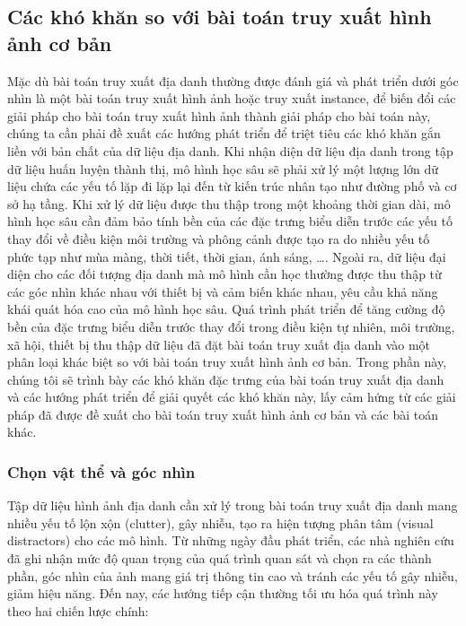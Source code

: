 \subsection{Các khó khăn so với bài toán truy xuất hình ảnh cơ bản}

Mặc dù bài toán truy xuất địa danh thường được đánh giá và phát triển dưới góc nhìn là một bài toán truy xuất hình ảnh hoặc truy xuất instance, để biến đổi các giải pháp cho bài toán truy xuất hình ảnh thành giải pháp cho bài toán này, chúng ta cần phải đề xuất các hướng phát triển để triệt tiêu các khó khăn gắn liền với bản chất của dữ liệu địa danh. Khi nhận diện dữ liệu địa danh trong tập dữ liệu huấn luyện thành thị, mô hình học sâu sẽ phải xử lý một lượng lớn dữ liệu chứa các yếu tố lặp đi lặp lại đến từ kiến trúc nhân tạo như đường phố và cơ sở hạ tầng. Khi xử lý dữ liệu được thu thập trong một khoảng thời gian dài, mô hình học sâu cần đảm bảo tính bền của các đặc trưng biểu diễn trước các yếu tố thay đổi về điều kiện môi trường và phông cảnh được tạo ra do nhiều yếu tố phức tạp như mùa màng, thời tiết, thời gian, ánh sáng, \dots. Ngoài ra, dữ liệu đại diện cho các đối tượng địa danh mà mô hình cần học thường được thu thập từ các góc nhìn khác nhau với thiết bị và cảm biến khác nhau, yêu cầu khả năng khái quát hóa cao của mô hình học sâu. Quá trình phát triển để tăng cường độ bền của đặc trưng biểu diễn trước thay đổi trong điều kiện tự nhiên, môi trường, xã hội, thiết bị thu thập dữ liệu đã đặt bài toán truy xuất địa danh vào một phân loại khác biệt so với bài toán truy xuất hình ảnh cơ bản. Trong phần này, chúng tôi sẽ trình bày các khó khăn đặc trưng của bài toán truy xuất địa danh và các hướng phát triển để giải quyết các khó khăn này, lấy cảm hứng từ các giải pháp đã được đề xuất cho bài toán truy xuất hình ảnh cơ bản và các bài toán khác.

\subsubsection{Chọn vật thể và góc nhìn}

Tập dữ liệu hình ảnh địa danh cần xử lý trong bài toán truy xuất địa danh mang nhiều yếu tố lộn xộn (clutter), gây nhiễu, tạo ra hiện tượng phân tâm (visual distractors) cho các mô hình. Từ những ngày đầu phát triển, các nhà nghiên cứu đã ghi nhận mức độ quan trọng của quá trình quan sát và chọn ra các thành phần, góc nhìn của ảnh mang giá trị thông tin cao và tránh các yếu tố gây nhiễu, giảm hiệu năng\cite{4270175, knopp2010avoiding, predicting-good-features, Torii2013VisualPR, arandjelovic2015dislocation}. Đến nay, các hướng tiếp cận thường tối ưu hóa quá trình này theo hai chiến lược chính:

